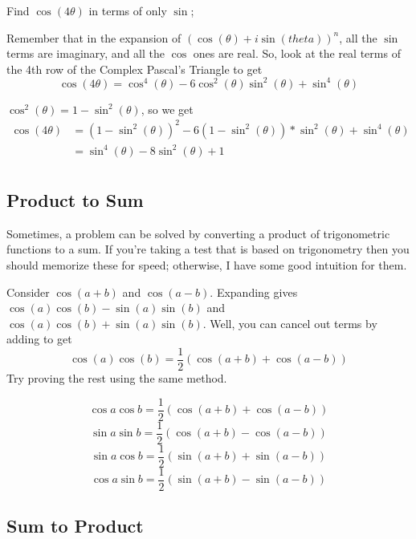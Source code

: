 \documentclass{article}
\begin{document}
\begin{example}
\begin{problem}
Find $\cos(4\theta)$ in terms of only $\sin$;
\end{problem}


\noindent Remember that in the expansion of $(\cos(\theta)+i\sin(theta))^n$, all the $\sin$ terms are imaginary, and all the $\cos$ ones are real. So, look at the real terms of the 4th row of the Complex Pascal's Triangle to get $$\cos(4\theta) = \cos^4(\theta)-6\cos^2(\theta)\sin^2(\theta)+\sin^4(\theta)$$


$\cos^2(\theta) = 1-\sin^2(\theta)$, so we get 
\begin{align*}
\cos(4\theta) &= (1-\sin^2(\theta))^2 - 6(1-\sin^2(\theta))*\sin^2(\theta)+\sin^4(\theta)\\
&= \boxed{\sin^4(\theta)-8\sin^2(\theta)+1}\\
\end{align*}

\end{example}



\vspace{5mm}
\subsection{Product to Sum}
\noindent Sometimes, a problem can be solved by converting a product of trigonometric functions to a sum. If you're taking a test that is based on trigonometry then you should memorize these for speed; otherwise, I have some good intuition for them. 

\begin{example}
\vspace{5mm}
\noindent Consider $\cos(a+b)$ and $\cos(a-b)$. Expanding gives $\cos{(a)}\cos{(b)}-\sin{(a)}\sin{(b)}$ and $\cos{(a)}\cos{(b)}+\sin{(a)}\sin{(b)}$. Well, you can cancel out terms by adding to get $$\cos{(a)}\cos{(b)} = \frac{1}{2}(\cos{(a+b)}+\cos{(a-b)})$$ Try proving the rest using the same method.
\end{example}


\begin{theorem}
$$\cos{a}\cos{b} = \frac{1}{2}(\cos{(a+b)}+\cos{(a-b)})$$
$$\sin{a}\sin{b} = \frac{1}{2}(\cos{(a+b)}-\cos{(a-b)})$$
$$\sin{a}\cos{b} = \frac{1}{2}(\sin{(a+b)}+\sin{(a-b)})$$
$$\cos{a}\sin{b} = \frac{1}{2}(\sin{(a+b)}-\sin{(a-b)})$$
\end{theorem}


\subsection{Sum to Product}
\end{document}
